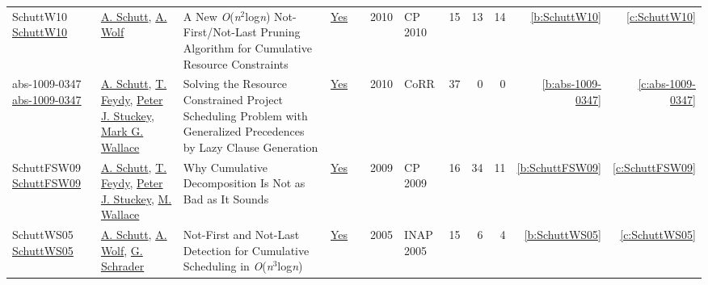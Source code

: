 {\begin{longtable}{>{\raggedright\arraybackslash}p{3cm}>{\raggedright\arraybackslash}p{6cm}>{\raggedright\arraybackslash}p{6.5cm}rrrp{2.5cm}rrrrr}
SchuttW10 \href{https://doi.org/10.1007/978-3-642-15396-9\_36}{SchuttW10} & \hyperref[auth:a125]{A. Schutt}, \hyperref[auth:a51]{A. Wolf} & A New \emph{O}(\emph{n}\({}^{\mbox{2}}\)log\emph{n}) Not-First/Not-Last Pruning Algorithm for Cumulative Resource Constraints & \href{../works/SchuttW10.pdf}{Yes} & \cite{SchuttW10} & 2010 & CP 2010 & 15 & 13 & 14 & \ref{b:SchuttW10} & \ref{c:SchuttW10}\\
abs-1009-0347 \href{http://arxiv.org/abs/1009.0347}{abs-1009-0347} & \hyperref[auth:a125]{A. Schutt}, \hyperref[auth:a155]{T. Feydy}, \hyperref[auth:a126]{Peter J. Stuckey}, \hyperref[auth:a156]{Mark G. Wallace} & Solving the Resource Constrained Project Scheduling Problem with Generalized Precedences by Lazy Clause Generation & \href{../works/abs-1009-0347.pdf}{Yes} & \cite{abs-1009-0347} & 2010 & CoRR & 37 & 0 & 0 & \ref{b:abs-1009-0347} & \ref{c:abs-1009-0347}\\
SchuttFSW09 \href{https://doi.org/10.1007/978-3-642-04244-7\_58}{SchuttFSW09} & \hyperref[auth:a125]{A. Schutt}, \hyperref[auth:a155]{T. Feydy}, \hyperref[auth:a126]{Peter J. Stuckey}, \hyperref[auth:a117]{M. Wallace} & Why Cumulative Decomposition Is Not as Bad as It Sounds & \href{../works/SchuttFSW09.pdf}{Yes} & \cite{SchuttFSW09} & 2009 & CP 2009 & 16 & 34 & 11 & \ref{b:SchuttFSW09} & \ref{c:SchuttFSW09}\\
SchuttWS05 \href{https://doi.org/10.1007/11963578\_6}{SchuttWS05} & \hyperref[auth:a125]{A. Schutt}, \hyperref[auth:a51]{A. Wolf}, \hyperref[auth:a720]{G. Schrader} & Not-First and Not-Last Detection for Cumulative Scheduling in \emph{O}(\emph{n}\({}^{\mbox{3}}\)log\emph{n}) & \href{../works/SchuttWS05.pdf}{Yes} & \cite{SchuttWS05} & 2005 & INAP 2005 & 15 & 6 & 4 & \ref{b:SchuttWS05} & \ref{c:SchuttWS05}\\
\end{longtable}
}

\clearpage
